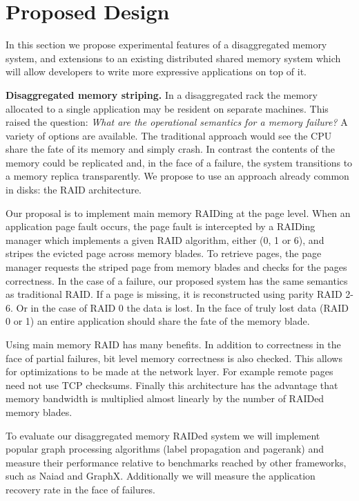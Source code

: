 \section{Proposed Design}
\label{sec:proposal}
In this section we propose experimental features of a disaggregated
memory system, and extensions to an existing distributed shared memory
system which will allow developers to write more expressive
applications on top of it.


\textbf{Disaggregated memory striping.} In a disaggregated
rack the memory allocated to a single application may be resident on
separate machines. This raised the question: \emph{What are the operational
semantics for a memory failure?} A variety of
options are available. The traditional approach would see the
CPU share the fate of its memory and simply crash. In
contrast the contents of the memory could be replicated and, in the
face of a failure, the system transitions to a memory replica transparently.
We propose to use an approach already common in disks: the RAID
architecture.

Our proposal is to implement main memory RAIDing at the page level.
When an application page fault occurs, the page fault is intercepted
by a RAIDing manager which implements a given RAID algorithm, either
(0, 1 or 6), and stripes the evicted page across memory blades. To
retrieve pages, the page manager requests the striped page from memory
blades and checks for the pages correctness. In the case of a failure,
our proposed system has the same semantics as traditional RAID. If a
page is missing, it is reconstructed using parity RAID 2-6. Or in the
case of RAID 0 the data is lost. In the face of truly lost data (RAID
0 or 1) an entire application should share the fate of the memory
blade.

Using main memory RAID has many benefits. In addition to correctness
in the face of partial failures, bit level memory correctness is also
checked.  This allows for optimizations to be made at the network
layer. For example remote pages need not use TCP checksums. Finally
this architecture has the advantage that memory bandwidth is
multiplied almost linearly by the number of RAIDed memory blades.

To evaluate our disaggregated memory RAIDed system we will implement
popular graph processing algorithms (label propagation and pagerank)
and measure their performance relative to benchmarks reached by other
frameworks, such as Naiad and GraphX. Additionally we will measure
the application recovery rate in the face of failures. 

